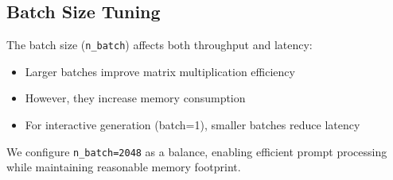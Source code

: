 \subsection{Batch Size Tuning}

The batch size (\texttt{n\_batch}) affects both throughput and latency:

\begin{itemize}
    \item Larger batches improve matrix multiplication efficiency
    \item However, they increase memory consumption
    \item For interactive generation (batch=1), smaller batches reduce latency
\end{itemize}

We configure \texttt{n\_batch=2048} as a balance, enabling efficient prompt processing while maintaining reasonable memory footprint.
